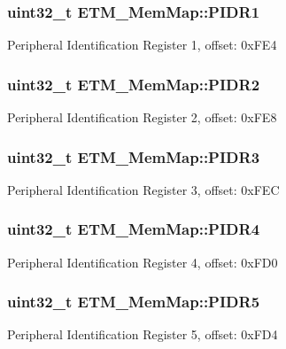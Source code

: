 \subsubsection[{P\+I\+D\+R1}]{\setlength{\rightskip}{0pt plus 5cm}uint32\+\_\+t E\+T\+M\+\_\+\+Mem\+Map\+::\+P\+I\+D\+R1}\label{struct_e_t_m___mem_map_a2b4d5fe9290dc96888a3c8361ff0b1cb}
Peripheral Identification Register 1, offset\+: 0x\+F\+E4 \hypertarget{struct_e_t_m___mem_map_a60875d0450fd0cc4953bf5551153dc24}{}
\subsubsection[{P\+I\+D\+R2}]{\setlength{\rightskip}{0pt plus 5cm}uint32\+\_\+t E\+T\+M\+\_\+\+Mem\+Map\+::\+P\+I\+D\+R2}\label{struct_e_t_m___mem_map_a60875d0450fd0cc4953bf5551153dc24}
Peripheral Identification Register 2, offset\+: 0x\+F\+E8 \hypertarget{struct_e_t_m___mem_map_a43bc7f48732725721d1af673497aeb3b}{}
\subsubsection[{P\+I\+D\+R3}]{\setlength{\rightskip}{0pt plus 5cm}uint32\+\_\+t E\+T\+M\+\_\+\+Mem\+Map\+::\+P\+I\+D\+R3}\label{struct_e_t_m___mem_map_a43bc7f48732725721d1af673497aeb3b}
Peripheral Identification Register 3, offset\+: 0x\+F\+E\+C \hypertarget{struct_e_t_m___mem_map_a5ee81b650eb5614f457473769ea8fb89}{}
\subsubsection[{P\+I\+D\+R4}]{\setlength{\rightskip}{0pt plus 5cm}uint32\+\_\+t E\+T\+M\+\_\+\+Mem\+Map\+::\+P\+I\+D\+R4}\label{struct_e_t_m___mem_map_a5ee81b650eb5614f457473769ea8fb89}
Peripheral Identification Register 4, offset\+: 0x\+F\+D0 \hypertarget{struct_e_t_m___mem_map_abc897f6c82134908fb148e9283399e7c}{}
\subsubsection[{P\+I\+D\+R5}]{\setlength{\rightskip}{0pt plus 5cm}uint32\+\_\+t E\+T\+M\+\_\+\+Mem\+Map\+::\+P\+I\+D\+R5}\label{struct_e_t_m___mem_map_abc897f6c82134908fb148e9283399e7c}
Peripheral Identification Register 5, offset\+: 0x\+F\+D4 \hypertarget{struct_e_t_m___mem_map_a2c8b019b70ddbec18c4ee65fa670f6f7}{}
